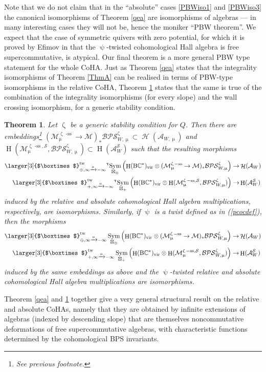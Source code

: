 \documentclass[a4paper,10pt]{amsart}
\renewcommand{\zeta}{\upzeta}
\renewcommand{\psi}{\uppsi}
\renewcommand{\tau}{\uptau}
\renewcommand{\mu}{\upmu}
\newtheorem{thmx}{Theorem}
\DeclareMathOperator{\BC}{B\mathbb{C}^*}
\newcommand{\Boxtimes}{\mbox{\larger[3]{$\boxtimes$}}}
\newcommand{\SP}{\mathcal{S}}
\newcommand{\Msp}{\mathcal{M}}
\newcommand{\DTS}{\mathcal{BPS}}
\DeclareMathOperator{\sst}{-ss}
\DeclareMathOperator{\tw}{tw}
\DeclareMathOperator{\Sym}{Sym}
\DeclareMathOperator{\vir}{vir}
\DeclareMathOperator{\Ho}{\mathcal{H}}
\DeclareMathOperator{\HO}{H}
\begin{document}
Note that we do not claim that in the ``absolute'' cases \eqref{PBWiso1} and \eqref{PBWiso3} the canonical isomorphisms of Theorem \ref{qea} are isomorphisms of algebras --- in many interesting cases they will not be, hence the moniker ``PBW theorem''.  We expect that the case of symmetric quivers with zero potential, for which it is proved by Efimov in \cite{Efimov} that the $\psi$-twisted cohomological Hall algebra is free supercommutative, is atypical.
\smallbreak
Our final theorem is a more general PBW type statement for the whole CoHA.  Just as Theorem \ref{qea} states that the integrality isomorphisms of Theorem \ref{ThmA} can be realised in terms of PBW-type isomorphisms in the relative CoHA, Theorem \ref{strongPBW} states that the same is true of the combination of the integrality isomorphisms (for every slope) and the wall crossing isomorphism, for a generic stability condition.
\begin{thmx}\label{strongPBW}
Let $\zeta$ be a generic stability condition for $Q$.  Then there are embeddings\footnote{See previous footnote.} $(\Msp^{\zeta\sst}_{\mu}\rightarrow\Msp)_* \DTS^{\zeta}_{W,\mu}\subset \Ho(\mathcal{A}_{W,\mu})$ and $\HO(\Msp_{\mu}^{\zeta\sst,\SP},\DTS^{\zeta}_{W,\mu})\subset \HO(\mathcal{A}^{\SP}_W)$ such that the resulting morphisms
\begin{align*}
\Boxtimes_{\oplus, \infty\xrightarrow{\mu} -\infty}^{\tw} {}^{\tau}\!\Sym_{\boxtimes_{\oplus}}\left(\HO(\BC)_{\vir}\otimes (\Msp^{\zeta\sst}_{\mu}\rightarrow\Msp)_* \DTS^{\zeta}_{W,\mu}\right)\rightarrow &\Ho(\mathcal{A}_W)\\
\Boxtimes_{+, \infty\xrightarrow{\mu} -\infty}^{\tw}{}^{\tau}\!\Sym_{\boxtimes_+}\left( \HO(\BC)_{\vir}\otimes \HO(\Msp_{\mu}^{\zeta\sst,\SP},\DTS^{\zeta}_{W,\mu})\right)\rightarrow &\HO(\mathcal{A}_W^{\SP})
\end{align*}
induced by the relative and absolute cohomological Hall algebra multiplications, respectively, are isomorphisms.  Similarly, if $\psi$ is a twist defined as in (\ref{pcocdef}), then the morphisms
\begin{align*}
\Boxtimes_{\oplus, \infty\xrightarrow{\mu} -\infty}^{\tw} \Sym_{\boxtimes_{\oplus}}\left(\HO(\BC)_{\vir}\otimes (\Msp^{\zeta\sst}_{\mu}\rightarrow\Msp)_* \DTS^{\zeta}_{W,\mu}\right)\rightarrow &\Ho(\mathcal{A}_W)\\
\Boxtimes_{+, \infty\xrightarrow{\mu} -\infty}^{\tw}\Sym_{\boxtimes_+}\left( \HO(\BC)_{\vir}\otimes \HO(\Msp_{\mu}^{\zeta\sst,\SP},\DTS^{\zeta}_{W,\mu})\right)\rightarrow &\HO(\mathcal{A}_W^{\SP})
\end{align*}
induced by the same embeddings as above and the $\psi$-twisted relative and absolute cohomological Hall algebra multiplications are isomorphisms.
\end{thmx}
Theorem \ref{qea} and \ref{strongPBW} together give a very general structural result on the relative and absolute CoHAs, namely that they are obtained by infinite extensions of algebras (indexed by descending slope) that are themselves noncommutative deformations of free supercommutative algebras, with characteristic functions determined by the cohomological BPS invariants.
\end{document}
